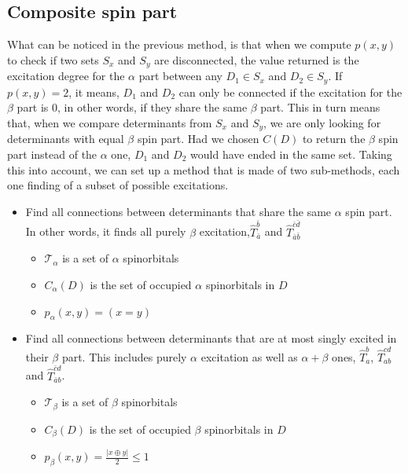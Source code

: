     
\subsection{Composite spin part}
What can be noticed in the previous method, is that when we compute $p(x, y)$ to check if two sets $S_x$ and $S_y$ are disconnected, the value returned is the excitation degree for the $\alpha$ part between any $D_1 \in S_x$ and $D_2 \in S_y$. If $p(x, y)=2$, it means, $D_1$ and $D_2$ can only be connected if the excitation for the $\beta$ part is 0, in other words, if they share the same $\beta$ part. This in turn means that, when we compare determinants from $S_x$ and $S_y$, we are only looking for determinants with equal $\beta$ spin part.
Had we chosen $C(D)$ to return the $\beta$ spin part instead of the $\alpha$ one, $D_1$ and $D_2$ would have ended in the same set.
Taking this into account, we can set up a method that is made of two sub-methods, each one finding of a subset of possible excitations.

\begin{itemize}
\item
Find all connections between determinants that share the same $\alpha$ spin part. In other words, it finds all purely $\beta$ excitation,$\hat T_{\bar a}^{\bar b}$ and $\hat T_{\bar a \bar b}^{\bar c \bar d}$
\begin{itemize}
	\item
$\mathcal{T}_\alpha$ is a set of $\alpha$ spinorbitals
	\item
$C_\alpha(D)$ is the set of occupied $\alpha$ spinorbitals in $D$
	\item
$p_\alpha(x, y) = (x = y)$
\end{itemize}
\item
Find all connections between determinants that are at most singly excited in their $\beta$ part.
This includes purely $\alpha$ excitation as well as $\alpha+\beta$ ones, $\hat T_a^b$, $\hat T_{ab}^{cd}$ and $\hat T_{\bar a b}^{\bar c d}$.
\begin{itemize}
	\item
$\mathcal{T}_\beta$ is a set of $\beta$ spinorbitals
	\item
$C_\beta(D)$ is the set of occupied $\beta$ spinorbitals in $D$
	\item
$p_\beta(x, y) = \frac{|x \oplus y|}{2} \leq 1$
\end{itemize}
\end{itemize}
    

